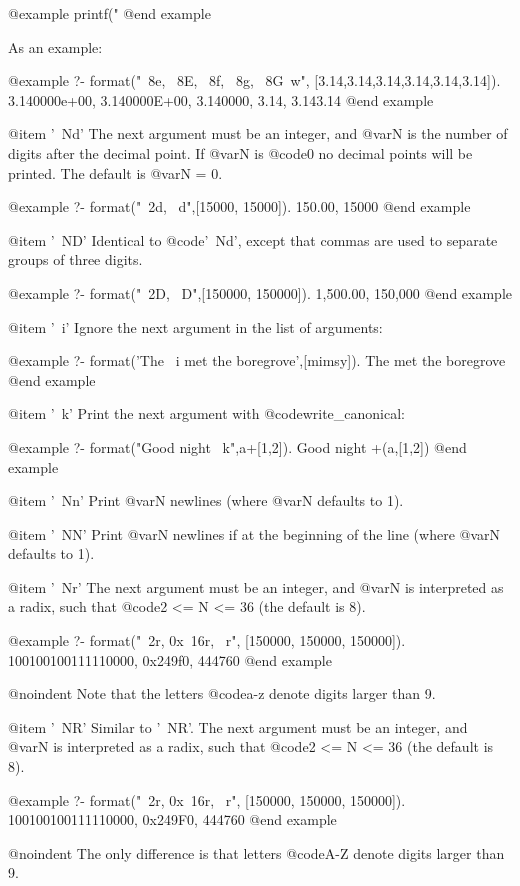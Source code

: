 {{{{{@example
    printf("%
    @end example

As an example:

@example
?- format("~8e, ~8E, ~8f, ~8g, ~8G~w",
          [3.14,3.14,3.14,3.14,3.14,3.14]).
3.140000e+00, 3.140000E+00, 3.140000, 3.14, 3.143.14
@end example

@item '~Nd'
The next argument must be an integer, and @var{N} is the number of digits
after the decimal point. If @var{N} is @code{0} no decimal points will be
printed. The default is @var{N = 0}.

@example
?- format("~2d, ~d",[15000, 15000]).
150.00, 15000
@end example

@item '~ND'
Identical to @code{'~Nd'}, except that commas are used to separate groups
of three digits.

@example
?- format("~2D, ~D",[150000, 150000]).
1,500.00, 150,000
@end example

@item '~i'
Ignore the next argument in the list of arguments:

@example
?- format('The ~i met the boregrove',[mimsy]).
The  met the boregrove
@end example

@item '~k'
Print the next argument with @code{write_canonical}:

@example
?- format("Good night ~k",a+[1,2]).
Good night +(a,[1,2])
@end example

@item '~Nn'
Print @var{N} newlines (where @var{N} defaults to 1).

@item '~NN'
Print @var{N} newlines if at the beginning of the line (where @var{N}
defaults to 1).

@item '~Nr'
The next argument must be an integer, and @var{N} is interpreted as a
radix, such that @code{2 <= N <= 36} (the default is 8).

@example
?- format("~2r, 0x~16r, ~r",
          [150000, 150000, 150000]).
100100100111110000, 0x249f0, 444760
@end example

@noindent
Note that the letters @code{a-z} denote digits larger than 9.

@item '~NR'
Similar to '~NR'. The next argument must be an integer, and @var{N} is
interpreted as a radix, such that @code{2 <= N <= 36} (the default is 8).

@example
?- format("~2r, 0x~16r, ~r",
          [150000, 150000, 150000]).
100100100111110000, 0x249F0, 444760
@end example

@noindent
The only difference is that letters @code{A-Z} denote digits larger than 9.

}}}}}
